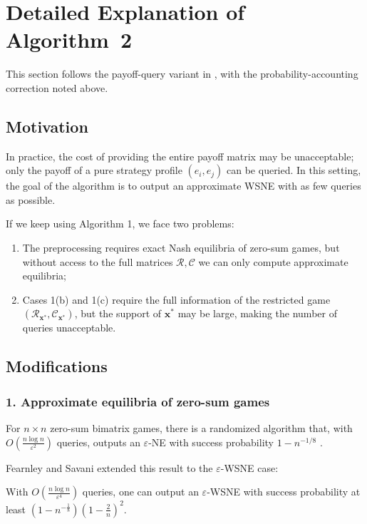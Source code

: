 \section{Detailed Explanation of Algorithm~2}
\label{app:algorithm-two-explanation}

This section follows the payoff-query variant in \cite[Section~4]{12WSNE}, with the probability-accounting correction noted above.

\subsection{Motivation}
In practice, the cost of providing the entire payoff matrix may be unacceptable; only the payoff of a pure strategy profile \((e_i, e_j)\) can be queried. In this setting, the goal of the algorithm is to output an approximate WSNE with as few queries as possible.

If we keep using Algorithm 1, we face two problems:
\begin{enumerate}
  \item The preprocessing requires exact Nash equilibria of zero-sum games, but without access to the full matrices \(\mathcal{R}, \mathcal{C}\) we can only compute approximate equilibria;
  \item Cases 1(b) and 1(c) require the full information of the restricted game \((\mathcal{R}_{\mathbf{x}^*}, \mathcal{C}_{\mathbf{x}^*})\), but the support of \(\mathbf{x}^*\) may be large, making the number of queries unacceptable.
\end{enumerate}

\subsection{Modifications}

\subsubsection*{1. Approximate equilibria of zero-sum games}

For \(n \times n\) zero-sum bimatrix games, there is a randomized algorithm that, with \(O\left(\frac{n \log n}{\varepsilon^2}\right)\) queries, outputs an \(\varepsilon\)-NE with success probability \(1 - n^{-1/8}\) \cite[Theorem~1]{goldbergRoth14}.

Fearnley and Savani extended this result to the \(\varepsilon\)-WSNE case:
\begin{lemma}
  \label{lem:query-efficient-eps-wsne-in-zero-sum-games}
  With \(O\left(\frac{n \log n}{\varepsilon^4}\right)\) queries, one can output an \(\varepsilon\)-WSNE with success probability at least \(\left( 1 - n^{-\frac{1}{8}} \right)\left( 1 - \frac{2}{n} \right)^2\).
\end{lemma}

